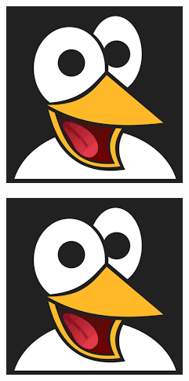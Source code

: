 \documentclass{CSICC2020}
\begin{document}
\begin{figure}
\centering
\begin{subfigure}[b]{0.31\textwidth}
\includegraphics[width=\linewidth]{./Images/blank}
\caption{}
\label{fig:gull}
\end{subfigure}
\begin{subfigure}[b]{0.31\textwidth}
\includegraphics[width=\linewidth]{./Images/blank}

\end{subfigure}
\end{figure}
\end{document}
